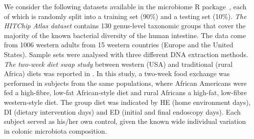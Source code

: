 \documentclass{article}
\begin{document}
We consider the following datasets available in the microbiome R package~\cite{lsbsMRP},
each of which is randomly split into a training set (90\%) and a testing set (10\%).
{\emph{The HITChip Atlas dataset \cite{lsssTEI}}} contains 130 genus-level taxonomic groups that
cover the majority of the known bacterial diversity of the human intestine.
The data come from 1006 western adults from 15 western countries (Europe and the United States). Sample sets were analysed with three different DNA extraction methods.
{\emph{The two-week diet swap study}} between western (USA) and traditional (rural Africa) diets was reported in \cite{olloFFC}.
In this study, a two-week food exchange was performed in subjects from the same populations, where African Americans were
fed a high-fibre, low-fat African-style diet and rural Africans a high-fat, low-fibre western-style diet.
The group diet was indicated by HE (home environment days), DI (dietary intervention days) and ED (initial and final endoscopy days).
Each subject served as his/her own control, given the known wide individual variation in colonic microbiota composition.

\end{document}
